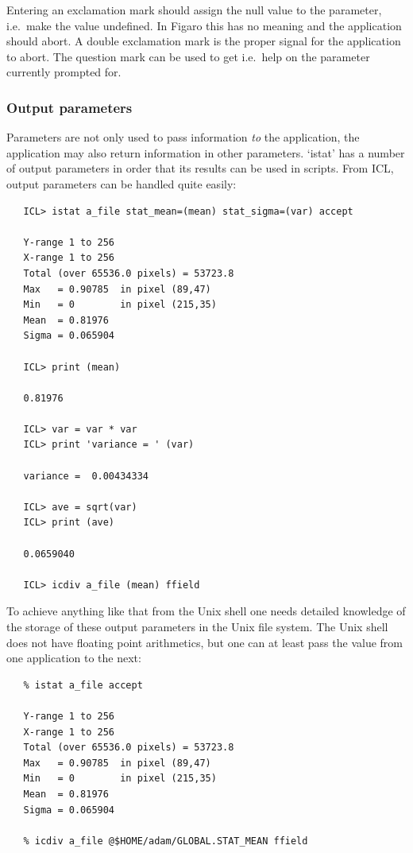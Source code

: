    Entering an exclamation mark should assign the null value to the
   parameter, i.e.\ make the value undefined. In Figaro this has no
   meaning and the application should abort. A double exclamation mark
   is the proper signal for the application to abort. The question mark
   can be used to get
   i.e.\ help on the parameter currently prompted for.


\subsubsection{\label{paramsoutput}Output parameters}

   Parameters are not only used to pass information {\em to\/}
   the application, the application may also return information in other
   parameters. `istat' has a number of output parameters in order that
   its results can be used in scripts. From ICL, output parameters can be
   handled quite easily:

\begin{verbatim}
   ICL> istat a_file stat_mean=(mean) stat_sigma=(var) accept

   Y-range 1 to 256
   X-range 1 to 256
   Total (over 65536.0 pixels) = 53723.8
   Max   = 0.90785  in pixel (89,47)
   Min   = 0        in pixel (215,35)
   Mean  = 0.81976
   Sigma = 0.065904

   ICL> print (mean)

   0.81976

   ICL> var = var * var
   ICL> print 'variance = ' (var)

   variance =  0.00434334

   ICL> ave = sqrt(var)
   ICL> print (ave)

   0.0659040

   ICL> icdiv a_file (mean) ffield
\end{verbatim}

   To achieve anything like that from the Unix shell one needs detailed
   knowledge of the storage of these output parameters in the Unix file
   system. The Unix shell does not have floating point arithmetics, but
   one can at least pass the value from one application to the next:

\begin{verbatim}
   % istat a_file accept

   Y-range 1 to 256
   X-range 1 to 256
   Total (over 65536.0 pixels) = 53723.8
   Max   = 0.90785  in pixel (89,47)
   Min   = 0        in pixel (215,35)
   Mean  = 0.81976
   Sigma = 0.065904

   % icdiv a_file @$HOME/adam/GLOBAL.STAT_MEAN ffield
\end{verbatim}

